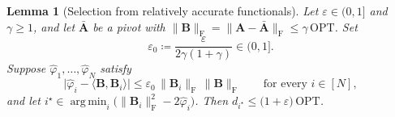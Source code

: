 \documentclass{article}
\renewcommand{\vec}[1]{\mathbf{#1}}          %
\newcommand{\F}{\mathrm{F}}                  %
\newcommand{\eps}{\varepsilon}
\newcommand{\OPT}{\mathrm{OPT}}
\newcommand{\inner}[2]{\langle #1, #2 \rangle}
\DeclareMathOperator*{\argmin}{arg\,min}
\newtheorem{lemma}[theorem]{Lemma}
\theoremstyle{remark}
\begin{document}
\begin{lemma}[Selection from relatively accurate functionals]\label{lem:select}
Let $\eps \in (0,1]$ and $\gamma \ge 1$, and let $\bar{\vec{A}}$ be a pivot with $\|\vec{B}\|_\F = \|\vec{A} - \bar{\vec{A}}\|_\F \le \gamma\,\OPT$.
Set
\begin{equation}\label{eq:eps0}
\eps_0 \coloneqq \frac{\eps}{2\gamma(1+\gamma)} \in (0,1] .
\end{equation}
Suppose $\hat{\varphi}_1, \dots, \hat{\varphi}_N$ satisfy
\begin{equation}\label{eq:relacc}
\bigl|\hat{\varphi}_i - \inner{\vec{B}}{\vec{B}_i}\bigr| \le \eps_0 \, \|\vec{B}_i\|_\F \, \|\vec{B}\|_\F
\qquad\text{for every } i \in [N],
\end{equation}
and let $i^\star \in \argmin_i \bigl( \|\vec{B}_i\|_\F^2 - 2\hat{\varphi}_i \bigr)$.
Then $d_{i^\star} \le \bigl(1 + \eps\bigr)\,\OPT$.
\end{lemma}
\end{document}
